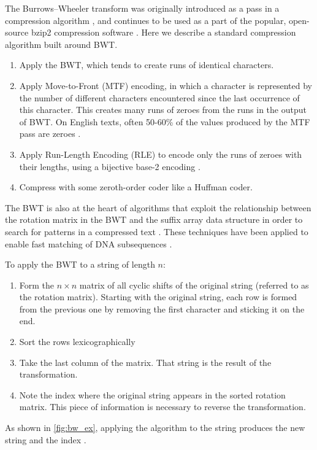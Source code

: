 \documentclass[sigplan,10pt,anonymous,review]{thesis}
\begin{document}
The Burrows--Wheeler transform was originally introduced as a pass in a
compression algorithm \cite{bw}, and continues to be used as a part of
the popular, open-source bzip2 compression software \cite{tsai_2016}.
Here we describe a standard compression algorithm built around BWT.
\begin{enumerate}
\item Apply the BWT, which tends to create runs of identical
  characters.
\item Apply Move-to-Front (MTF) encoding, in which a character is
  represented by the number of different characters encountered since
  the last occurrence of this character. This creates many runs of
  zeroes from the runs in the output of BWT. On English texts, often
  50-60\% of the values produced by the MTF pass are zeroes
  \cite{fenwick2007}.
\item Apply Run-Length Encoding (RLE) to encode only the runs of
  zeroes with their lengths, using a bijective base-2 encoding
  \cite{bw-analysis, tsai_2016}.
\item Compress with some zeroth-order coder like a Huffman coder.
\end{enumerate}

The BWT is also at the heart of algorithms that exploit the
relationship between the rotation matrix in the BWT and the suffix
array data structure in order to search for patterns in a compressed
text \cite{ferragina_index}. These techniques have been applied to
enable fast matching of DNA subsequences \cite{dna}.

To apply the BWT to a string of length $n$:
\begin{enumerate}
\item Form the \(n \times n\) matrix of all cyclic shifts of the
  original string (referred to as the rotation matrix). Starting
  with the original string, each row is formed from the previous one
  by removing the first character and sticking it on the end.
\item Sort the rows lexicographically
\item Take the last column of the matrix. That string is the result of
  the transformation.
\item Note the index where the original string appears in the sorted
  rotation matrix. This piece of information is necessary to reverse
  the transformation.
\end{enumerate}
As shown in \cref{fig:bw_ex}, applying the algorithm to the string
 produces the new string  and the
index .
\end{document}
